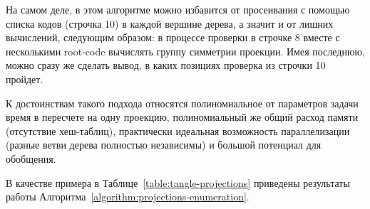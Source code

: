 \documentclass[12pt]{article}
\theoremstyle{plain}
\theoremstyle{definition}
\def\RC{\hbox{root-code}}
\begin{document}
		На самом деле, в этом алгоритме можно избавится от просеивания с помощью списка кодов (строчка 10) в каждой вершине дерева,
		а значит и от лишних вычислений, следующим образом: в процессе проверки в строчке 8 вместе с несколькими \RC{} вычислять группу
		симметрии проекции. Имея последнюю, можно сразу же сделать вывод, в каких позициях проверка из строчки 10 пройдет.

		К достоинствам такого подхода относятся полиномиальное от параметров задачи время в пересчете на одну проекцию, полиномиальный же
		общий расход памяти (отсутствие хеш-таблиц), практически идеальная возможность параллелизации (разные ветви дерева полностью
		независимы) и большой потенциал для обобщения.

		В качестве примера в Таблице~\ref{table:tangle-projections} приведены результаты работы Алгоритма~\ref{algorithm:projections-enumeration}.
\end{document}
